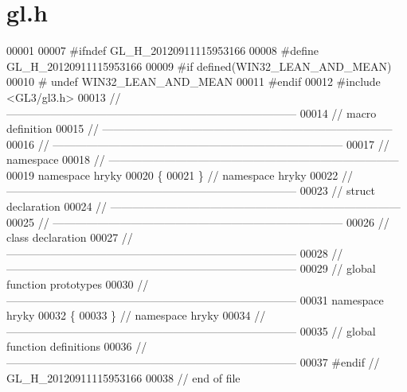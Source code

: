 \hypertarget{gl_8h_source}{\section{gl.\-h}
}

\begin{DoxyCode}
00001 
00007 \textcolor{preprocessor}{#ifndef GL\_H\_20120911115953166}
00008 \textcolor{preprocessor}{}\textcolor{preprocessor}{#define GL\_H\_20120911115953166}
00009 \textcolor{preprocessor}{}\textcolor{preprocessor}{#if defined(WIN32\_LEAN\_AND\_MEAN)}
00010 \textcolor{preprocessor}{}\textcolor{preprocessor}{#   undef WIN32\_LEAN\_AND\_MEAN}
00011 \textcolor{preprocessor}{}\textcolor{preprocessor}{#endif}
00012 \textcolor{preprocessor}{}\textcolor{preprocessor}{#include <GL3/gl3.h>}
00013 \textcolor{comment}{//
      ------------------------------------------------------------------------------}
00014 \textcolor{comment}{// macro definition}
00015 \textcolor{comment}{//
      ------------------------------------------------------------------------------}
00016 \textcolor{comment}{//
      ------------------------------------------------------------------------------}
00017 \textcolor{comment}{// namespace}
00018 \textcolor{comment}{//
      ------------------------------------------------------------------------------}
00019 \textcolor{keyword}{namespace }hryky
00020 \{
00021 \} \textcolor{comment}{// namespace hryky}
00022 \textcolor{comment}{//
      ------------------------------------------------------------------------------}
00023 \textcolor{comment}{// struct declaration}
00024 \textcolor{comment}{//
      ------------------------------------------------------------------------------}
00025 \textcolor{comment}{//
      ------------------------------------------------------------------------------}
00026 \textcolor{comment}{// class declaration}
00027 \textcolor{comment}{//
      ------------------------------------------------------------------------------}
00028 \textcolor{comment}{//
      ------------------------------------------------------------------------------}
00029 \textcolor{comment}{// global function prototypes}
00030 \textcolor{comment}{//
      ------------------------------------------------------------------------------}
00031 \textcolor{keyword}{namespace }hryky
00032 \{
00033 \} \textcolor{comment}{// namespace hryky}
00034 \textcolor{comment}{//
      ------------------------------------------------------------------------------}
00035 \textcolor{comment}{// global function definitions}
00036 \textcolor{comment}{//
      ------------------------------------------------------------------------------}
00037 \textcolor{preprocessor}{#endif // GL\_H\_20120911115953166}
00038 \textcolor{preprocessor}{}\textcolor{comment}{// end of file}
\end{DoxyCode}
